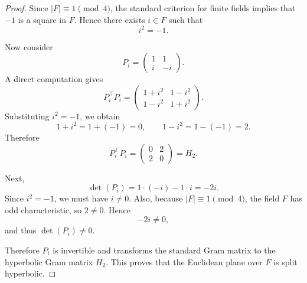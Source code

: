 \documentclass[12pt]{article}
\begin{document}
\begin{proof}
Since $|F| \equiv 1 \pmod 4$, the standard criterion for finite fields implies that $-1$ is a square in $F$. Hence there exists $i \in F$ such that
\[
i^2 = -1.
\]

Now consider
\[
P_i =
\begin{pmatrix}
1 & 1\\
i & -i
\end{pmatrix}.
\]
A direct computation gives
\[
P_i^{\top} P_i
=
\begin{pmatrix}
1+i^2 & 1-i^2\\
1-i^2 & 1+i^2
\end{pmatrix}.
\]
Substituting $i^2=-1$, we obtain
\[
1+i^2 = 1+(-1)=0,
\qquad
1-i^2 = 1-(-1)=2.
\]
Therefore
\[
P_i^{\top} P_i
=
\begin{pmatrix}
0 & 2\\
2 & 0
\end{pmatrix}
= H_2.
\]

Next,
\[
\det(P_i) = 1\cdot(-i)-1\cdot i = -2i.
\]
Since $i^2=-1$, we must have $i\neq 0$. Also, because $|F|\equiv 1 \pmod 4$, the field $F$ has odd characteristic, so $2\neq 0$. Hence
\[
-2i \neq 0,
\]
and thus $\det(P_i)\neq 0$.

Therefore $P_i$ is invertible and transforms the standard Gram matrix to the hyperbolic Gram matrix $H_2$. This proves that the Euclidean plane over $F$ is split hyperbolic. 
\end{proof}
\end{document}
